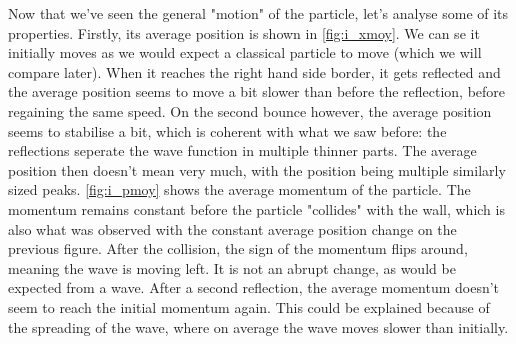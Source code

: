 Now that we've seen the general "motion" of the particle, let's analyse some of its properties. Firstly, its average position is shown in \autoref{fig:i_xmoy}. We can se it initially moves as we would expect a classical particle to move (which we will compare later). When it reaches the right hand side border, it gets reflected and the average position seems to move a bit slower than before the reflection, before regaining the same speed. On the second bounce however, the average position seems to stabilise a bit, which is coherent with what we saw before: the reflections seperate the wave function in multiple thinner parts. The average position then doesn't mean very much, with the position being multiple similarly sized peaks. \autoref{fig:i_pmoy} shows the average momentum of the particle. The momentum remains constant before the particle "collides" with the wall, which is also what was observed with the constant average position change on the previous figure. After the collision, the sign of the momentum flips around, meaning the wave is moving left. It is not an abrupt change, as would be expected from a wave. After a second reflection, the average momentum doesn't seem to reach the initial momentum again. This could be explained because of the spreading of the wave, where on average the wave moves slower than initially.

